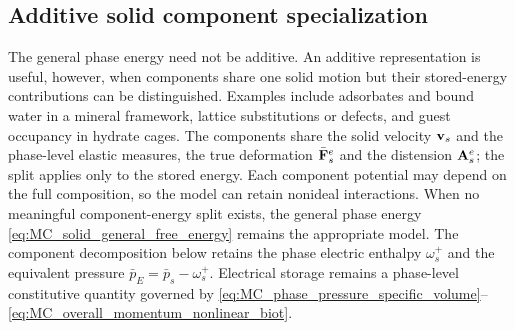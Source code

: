 \subsection{Additive solid component specialization}
\label{sec:MC_additive_component_specialization}

The general phase energy need not be additive.  An additive representation is
useful, however, when components share one solid motion but their stored-energy
contributions can be distinguished.  Examples include adsorbates and bound
water in a mineral framework, lattice substitutions or defects, and guest
occupancy in hydrate cages.  The components share the solid velocity \(\mathbf{v}_s\)
and the phase-level elastic measures, the true deformation \(\bar{\mathbf{F}}_s^e\)
and the distension \(\mathbf{A}_s^e\); the split applies only to the stored energy.
Each component potential may depend on the full composition, so the model can
retain nonideal interactions.  When no meaningful component-energy
split exists, the general phase energy
\eqref{eq:MC_solid_general_free_energy} remains the appropriate model.
The component decomposition below retains the phase electric enthalpy
\(\omega_s^+\) and the equivalent pressure
\(\bar p_E=\bar p_s-\omega_s^+\).  Electrical storage remains a phase-level
constitutive quantity governed by
\eqref{eq:MC_phase_pressure_specific_volume}--\eqref{eq:MC_overall_momentum_nonlinear_biot}.

